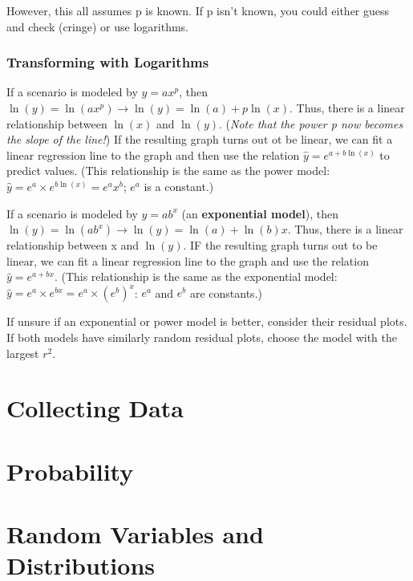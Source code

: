 \documentclass[12pt, a4paper]{article}
\theoremstyle{definition}
\begin{document}
However, this all assumes p is known. If p isn't known, you could either guess and check (cringe) or use logarithms.

\subsubsection{Transforming with Logarithms}

If a scenario is modeled by $y = ax^p$, then $\ln(y) = \ln(ax^p) \rightarrow \ln(y) = \ln(a) + p\ln(x)$.
Thus, there is a linear relationship between $\ln(x)$ and $\ln(y)$.
(\textit{Note that the power p now becomes the slope of the line!})
If the resulting graph turns out ot be linear, we can fit a linear regression line to the graph and then use the relation $\hat{y} = e^{a + b\ln(x)}$ to predict values.
(This relationship is the same as the power model: $\hat{y} = e^a \times e^{b\ln(x)} = e^a x^b$; $e^a$ is a constant.)

If a scenario is modeled by $y = ab^x$ (an \textbf{exponential model}), then $\ln(y) = \ln(ab^x) \rightarrow \ln(y) = \ln(a) + \ln(b)x$.
Thus, there is a linear relationship between x and $\ln(y)$.
IF the resulting graph turns out to be linear, we can fit a linear regression line to the graph and use the relation $\hat{y} = e^{a + bx}$.
(This relationship is the same as the exponential model: $\hat{y} = e^a \times e^{bx} = e^a \times (e^b)^x$: $e^a$ and $e^b$ are constants.)

If unsure if an exponential or power model is better, consider their residual plots.
If both models have similarly random residual plots, choose the model with the largest $r^2$.


\newpage

\section{Collecting Data}

\newpage

\section{Probability}

\newpage

\section{Random Variables and Distributions}

\newpage
\end{document}
